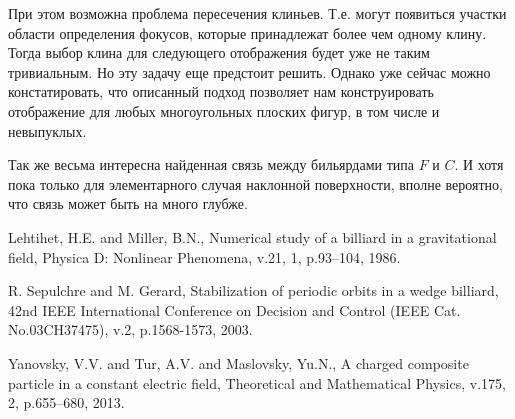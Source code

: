 \documentclass[a4paper]{article}
\begin{document}

При этом возможна проблема пересечения клиньев. Т.е. могут появиться участки области определения фокусов, которые принадлежат более чем одному клину. Тогда выбор клина для следующего отображения будет уже не таким тривиальным. Но эту задачу еще предстоит решить. Однако уже сейчас можно констатировать, что описанный подход позволяет нам конструировать отображение для любых многоугольных плоских фигур, в том числе и невыпуклых.

Так же весьма интересна найденная связь между бильярдами типа $F$ и $C$. И хотя пока только для элементарного случая наклонной поверхности, вполне вероятно, что связь может быть на много глубже.

\begin{thebibliography}{31}
 Lehtihet, H.E. and Miller, B.N., Numerical study of a billiard in a gravitational field, Physica D: Nonlinear Phenomena, v.21, 1, p.93--104, 1986.

 R. Sepulchre and M. Gerard, Stabilization of periodic orbits in a wedge billiard, 42nd IEEE International Conference on Decision and Control (IEEE Cat. No.03CH37475), v.2, p.1568-1573, 2003.

 Yanovsky, V.V. and Tur, A.V. and Maslovsky, Yu.N., A charged composite particle in a constant electric field, Theoretical and Mathematical Physics, v.175, 2, p.655--680, 2013.









\end{thebibliography}
\end{document}
